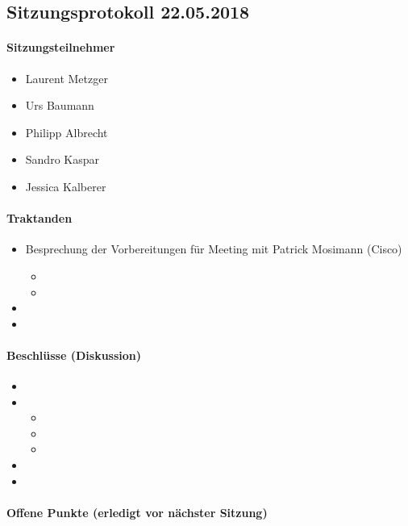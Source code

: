 \subsection{Sitzungsprotokoll 22.05.2018}

\paragraph{Sitzungsteilnehmer}
\begin{itemize}	
	\item Laurent Metzger 
	\item Urs Baumann
	\item Philipp Albrecht
	\item Sandro Kaspar
	\item Jessica Kalberer
\end{itemize}

\paragraph{Traktanden}
\begin{itemize}	
	\item Besprechung der Vorbereitungen für Meeting mit Patrick Mosimann (Cisco)
	\begin{itemize}
		\item 
		\item 
	\end{itemize}
	\item 
	\item 
\end{itemize}

\paragraph{Beschlüsse (Diskussion)}
\begin{itemize}	
	\item 
	\item 
	\begin{itemize}
		\item 
		\item 
		\item 
	\end{itemize}
	\item 
	\item 
\end{itemize}

\paragraph{Offene Punkte (erledigt vor nächster Sitzung)} \mbox{}

